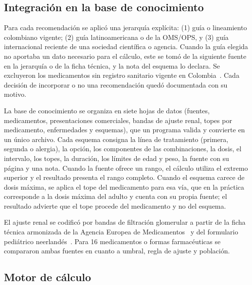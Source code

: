 \documentclass[11pt,a4paper]{article}
\begin{document}
\subsection{Integración en la base de conocimiento}

Para cada recomendación se aplicó una jerarquía explícita: (1) guía o lineamiento colombiano vigente; (2) guía latinoamericana o de la OMS/OPS, y (3) guía internacional reciente de una sociedad científica o agencia. Cuando la guía elegida no aportaba un dato necesario para el cálculo, este se tomó de la siguiente fuente en la jerarquía o de la ficha técnica, y la nota del esquema lo declara. Se excluyeron los medicamentos sin registro sanitario vigente en Colombia~\citep{invima}. Cada decisión de incorporar o no una recomendación quedó documentada con su motivo.

La base de conocimiento se organiza en siete hojas de datos (fuentes, medicamentos, presentaciones comerciales, bandas de ajuste renal, topes por medicamento, enfermedades y esquemas), que un programa valida y convierte en un único archivo. Cada esquema consigna la línea de tratamiento (primera, segunda o alergia), la opción, los componentes de las combinaciones, la dosis, el intervalo, los topes, la duración, los límites de edad y peso, la fuente con su página y una nota. Cuando la fuente ofrece un rango, el cálculo utiliza el extremo superior y el resultado presenta el rango completo. Cuando el esquema carece de dosis máxima, se aplica el tope del medicamento para esa vía, que en la práctica corresponde a la dosis máxima del adulto y cuenta con su propia fuente; el resultado advierte que el tope procede del medicamento y no del esquema.

El ajuste renal se codificó por bandas de filtración glomerular a partir de la ficha técnica armonizada de la Agencia Europea de Medicamentos~\citep{emaamoxil} y del formulario pediátrico neerlandés~\citep{kinderformularium}. Para 16 medicamentos o formas farmacéuticas se compararon ambas fuentes en cuanto a umbral, regla de ajuste y población.

\subsection{Motor de cálculo}
\end{document}
